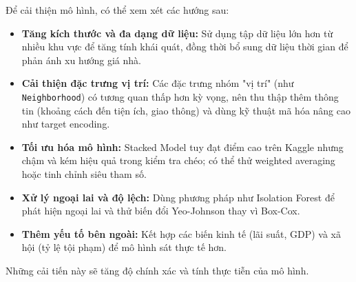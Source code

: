 Để cải thiện mô hình, có thể xem xét các hướng sau:  
\begin{itemize}
    \item \textbf{Tăng kích thước và đa dạng dữ liệu:} Sử dụng tập dữ liệu lớn hơn từ nhiều khu vực để tăng tính khái quát, đồng thời bổ sung dữ liệu thời gian để phản ánh xu hướng giá nhà.  
    \item \textbf{Cải thiện đặc trưng vị trí:} Các đặc trưng nhóm "vị trí" (như \texttt{Neighborhood}) có tương quan thấp hơn kỳ vọng, nên thu thập thêm thông tin (khoảng cách đến tiện ích, giao thông) và dùng kỹ thuật mã hóa nâng cao như target encoding.  
    \item \textbf{Tối ưu hóa mô hình:} Stacked Model tuy đạt điểm cao trên Kaggle nhưng chậm và kém hiệu quả trong kiểm tra chéo; có thể thử weighted averaging hoặc tinh chỉnh siêu tham số.  
    \item \textbf{Xử lý ngoại lai và độ lệch:} Dùng phương pháp như Isolation Forest để phát hiện ngoại lai và thử biến đổi Yeo-Johnson thay vì Box-Cox.  
    \item \textbf{Thêm yếu tố bên ngoài:} Kết hợp các biến kinh tế (lãi suất, GDP) và xã hội (tỷ lệ tội phạm) để mô hình sát thực tế hơn.  
\end{itemize}
Những cải tiến này sẽ tăng độ chính xác và tính thực tiễn của mô hình.